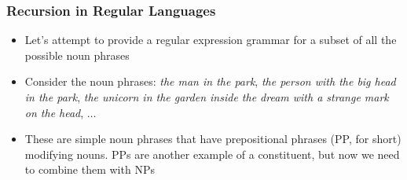 \begin{frame}
\frametitle{Recursion in Regular Languages}
\begin{itemize}
\item Let's attempt to provide a regular expression grammar for a subset of all the possible noun phrases
\item Consider the noun phrases: {\em the man in the park}, {\em the person with the big head in the park}, {\em the unicorn in the garden inside the dream with a strange mark on the head}, $\ldots$
\item These are simple noun phrases that have prepositional phrases (PP, for short) modifying nouns. PPs are another example of a constituent, but now we need to combine them with NPs
\end{itemize}

\end{frame}

